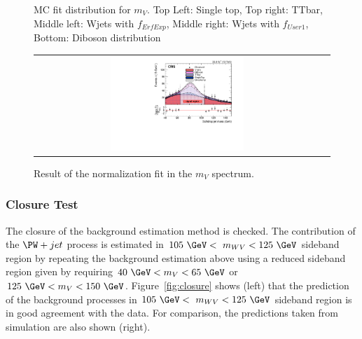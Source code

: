 \begin{figure}[htbp]
\begin{tabular}{cc}
	 \end{tabular}
	 \caption{MC fit distribution for $m_{V}$. Top Left: Single top, Top right: TTbar, Middle left: Wjets with $f_{ErfExp}$, Middle right: Wjets with $f_{User1}$, Bottom: Diboson distribution }
	 \label{fig:mW_1}
\end{figure}


\begin{figure}[htbp] 
	 \centering 
	 \begin{tabular}{cc}
	 \includegraphics[width=0.48\textwidth]{Plots/BackgroundEstimation/WV/m_j_fitting/m_j_sideband_WJets0_xww__with_pull.pdf}
	 \end{tabular}
	 \caption{Result of the normalization fit in the $m_{V}$ spectrum.}
	 \label{fig:Wjet_SR_SBR_Comp}
\end{figure}


\subsubsection{Closure Test}
The closure of the background estimation method is checked. The contribution of the $\PW+jet$ process is estimated in $105~\GeV<~m_{WV}<125~\GeV$ sideband region by repeating the background estimation above using a reduced sideband region given by requiring $40~\GeV < m_{V} < 65~\GeV$ or $125~\GeV < m_{V} < 150~\GeV$. Figure~\ref{fig:closure} shows (left) that the prediction of the background processes in $105~\GeV<~m_{WV}<125~\GeV$ sideband region is in good agreement with the data. For comparison, the predictions taken from simulation are also shown (right). 


